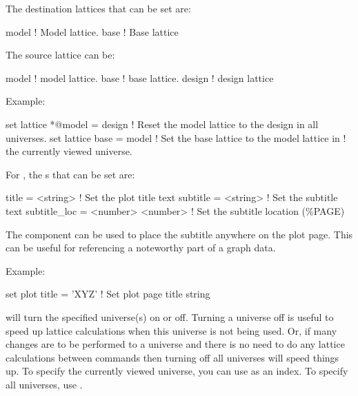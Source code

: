 {{\begin{description}
The destination lattices that can be set are:
\begin{example}
  model      ! Model lattice.
  base       ! Base lattice
\end{example}
The source lattice can be:
\begin{example}
  model       ! model lattice.
  base        ! base lattice.
  design      ! design lattice
\end{example}

Example:
\begin{example}
  set lattice *@model = design   ! Reset the model lattice to the design in all universes.
  set lattice base = model       ! Set the base lattice to the model lattice in 
                                 !   the currently viewed universe.
\end{example}


\item[set plot\_page <component> = <value1> \{<value2>\}] \Newline

For , the s that can be set are:
\begin{example}
  title        = <string>          ! Set the plot title text
  subtitle     = <string>          ! Set the subtitle text
  subtitle_loc = <number> <number> ! Set the subtitle location (\%PAGE)
\end{example}
The  component can be used to place the subtitle anywhere on
the plot page. This can be useful for referencing a noteworthy part of a graph
data.

Example:
\begin{example}
  set plot title = 'XYZ'  ! Set plot page title string
\end{example}


\item[\protect\parbox{6in}{
        set universe <what\_universe> on/off \\ 
        set universe <what\_universe> recalculate}] \Newline
{} will turn the specified universe(s) on or
off. Turning a universe off is useful to speed up lattice calculations
when this universe is not being used. Or, if many changes are to be
performed to a universe and there is no need to do any lattice
calculations between commands then turning off all universes will
speed things up. To specify the currently viewed universe, you can use
 as an index.  To specify all universes, use 
\vn{*}.  


\end{description}}}
